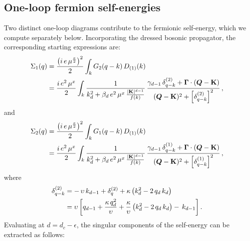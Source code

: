 \subsection{One-loop fermion self-energies}
\label{secferm}


Two distinct one-loop diagrams contribute to the fermionic self-energy, 
which we compute separately below. Incorporating the dressed bosonic propagator,
the corresponding starting expressions are:
\begin{align}
\label{eqsigma1}
\Sigma_1 (q) &= \frac{  \left (i\,e \, \mu^{\frac{x} {2} } \right )^2 }  {2} 
\int_k  G_2 (q-k)\, D_{(1)} (k) 
\nonumber \\ & =   \frac{i \,e^2 \,  \mu^{x}} {2}  \int_k
\frac{1 } {k_d^2
+   \beta_d \, e^2 \, \mu^{x} \,
 \frac{  |{\mathbf K}|^{d- 1} } { f(k)} }
  \,\frac{\gamma_{d-1} \, \delta_{q-k}^{(2)} 
+ \mathbf  \Gamma \cdot ({\boldsymbol  Q} -\mathbf  K)}
{({\boldsymbol  Q} -\mathbf  K)^2 + \left[\delta_{q-k}^{(2)} \right]^2
}  \, ,
\end{align}
and
\begin{align}
\label{eqsigma2}
\Sigma_2 (q) &= \frac{ \left (i\,e \, \mu^{\frac{x} {2} } \right )^2  }  {2} 
\int_k  G_1 (q-k)\, D_{(1)} (k) 
\nonumber \\ &  = 
 \frac{i \,e^2 \,  \mu^{x}} {2}  \int_k
\frac{1 } {k_d^2
+   \beta_d \, e^2 \, \mu^{x}  \,
 \frac{  |{\mathbf K}|^{ d - 1} } { f(k)} } 
\,\frac{\gamma_{d-1} \, \delta_{q-k}^{(1)} 
+ \mathbf  \Gamma \cdot ({\boldsymbol  Q} -\mathbf  K)}
{({\boldsymbol  Q} -\mathbf  K)^2 + \left[\delta_{q-k}^{(1)} \right]^2 }  \, ,
\end{align}
where 
\begin{align}
\delta_{q-k}^{(2)} & = -\, \upsilon \, k_{d-1}
+ \delta_q^{(2)} + \kappa \left( k_d^2 - 2  \, q_d \, k_d \right)
\nonumber \\ & =  \upsilon
\left [ q_{d-1} +
\frac{  \kappa \, q_d^2   } 
{\upsilon} + \frac{ \kappa} {\upsilon} 
\left( k_d^2 - 2  \, q_d \, k_d \right) - \, k_{d-1}
\right ].
\end{align}
Evaluating at $d = d_c - \epsilon$, the singular components of the 
self-energy can be extracted as follows:
